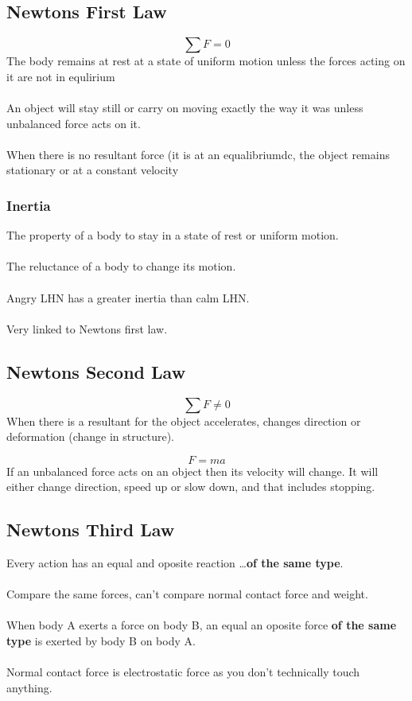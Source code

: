 \documentclass{article}
\begin{document}
\subsection{Newtons First Law}
\begin{equation}
	\sum F = 0
\end{equation}
The body remains at rest at a state of uniform motion unless the forces acting on it are not in equlirium
\\\\
An object will stay still or carry on moving exactly the way it was unless unbalanced force acts on it.
\\\\
When there is no resultant force (it is at an equalibriumdc, the object remains stationary or at a constant velocity

\subsubsection{Inertia}
The property of a body to stay in a state of rest or uniform motion.
\\\\
The reluctance of a body to change its motion.
\\\\
Angry LHN has a greater inertia than calm LHN.
\\\\
Very linked to Newtons first law.

\subsection{Newtons Second Law}
\begin{equation}
	\sum F \ne 0
\end{equation}
When there is a resultant for the object accelerates, changes direction or deformation (change in structure).

\begin{equation}
	F = ma
\end{equation}
If an unbalanced force acts on an object then its velocity will change.
It will either change direction, speed up or slow down, and that includes stopping.

\subsection{Newtons Third Law}
Every action has an equal and oposite reaction \ldots \textbf{of the same type}.
\\\\
Compare the same forces, can't compare normal contact force and weight.
\\\\
When body A exerts a force on body B, an equal an oposite force \textbf{of the same type} is exerted by
body B on body A.
\\\\
Normal contact force is electrostatic force as you don't technically touch anything.
\end{document}
